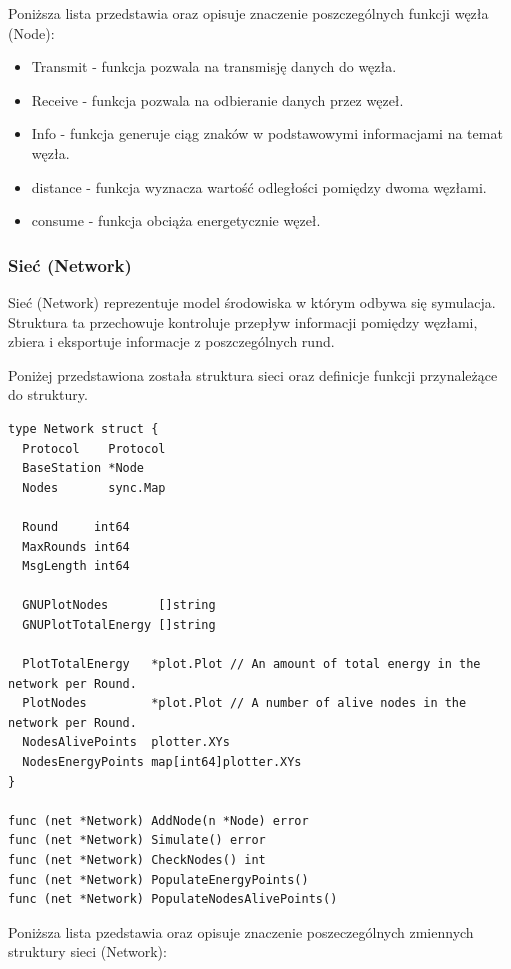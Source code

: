\documentclass[a4paper,12pt,twoside,openany]{report}
\begin{document}
Poniższa lista przedstawia oraz opisuje znaczenie poszczególnych funkcji węzła (Node):

\begin{itemize}
 \item Transmit - funkcja pozwala na transmisję danych do węzła.
 \item Receive - funkcja pozwala na odbieranie danych przez węzeł.
 \item Info - funkcja generuje ciąg znaków w podstawowymi informacjami na temat węzła.
 \item distance - funkcja wyznacza wartość odległości pomiędzy dwoma węzłami.
 \item consume - funkcja obciąża energetycznie węzeł.
\end{itemize}

\subsubsection{Sieć (Network)}

Sieć (Network) reprezentuje model środowiska w którym odbywa się symulacja. Struktura ta przechowuje kontroluje przepływ informacji pomiędzy węzłami,
zbiera i eksportuje informacje z poszczególnych rund.

Poniżej przedstawiona została struktura sieci oraz definicje funkcji przynależące do struktury.

\begin{lstlisting}
type Network struct {
  Protocol    Protocol
  BaseStation *Node
  Nodes       sync.Map

  Round     int64
  MaxRounds int64
  MsgLength int64

  GNUPlotNodes       []string
  GNUPlotTotalEnergy []string

  PlotTotalEnergy   *plot.Plot // An amount of total energy in the network per Round.
  PlotNodes         *plot.Plot // A number of alive nodes in the network per Round.
  NodesAlivePoints  plotter.XYs
  NodesEnergyPoints map[int64]plotter.XYs
}

func (net *Network) AddNode(n *Node) error
func (net *Network) Simulate() error
func (net *Network) CheckNodes() int
func (net *Network) PopulateEnergyPoints()
func (net *Network) PopulateNodesAlivePoints()
\end{lstlisting}

Poniższa lista pzedstawia oraz opisuje znaczenie poszeczególnych zmiennych struktury sieci (Network):
\end{document}
